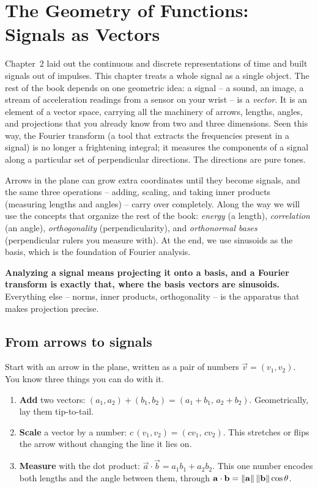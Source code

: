 \chapter{The Geometry of Functions: Signals as Vectors}

\chapterline

Chapter~2 laid out the continuous and discrete representations of time and built signals out of impulses.
This chapter treats a whole signal as a single object. The rest of the book depends on
one geometric idea: a signal -- a sound, an
image, a stream of acceleration readings from a sensor on your wrist -- is a \emph{vector}. It is an element of a vector space, carrying all
the machinery of arrows, lengths, angles, and projections that you already know from two and three
dimensions. Seen this way, the Fourier transform (a tool that extracts the frequencies present in a signal) is no longer a frightening integral; it
measures the components of a signal along a particular
set of perpendicular directions. The directions are pure tones.

Arrows in the plane can grow extra coordinates until they become signals, and the same three
operations -- adding, scaling, and taking inner products (measuring lengths and angles) -- carry over completely. Along the way we
will use the concepts that organize the rest of the book: \emph{energy} (a length),
\emph{correlation} (an angle), \emph{orthogonality} (perpendicularity), and \emph{orthonormal bases}
(perpendicular rulers you measure with). At the end, we use sinusoids as the basis, which is the foundation of Fourier analysis.

\begin{focusbox}
\textbf{Analyzing a signal means projecting it
onto a basis, and a Fourier transform is exactly that, where the basis vectors are sinusoids.}
Everything else -- norms, inner products, orthogonality -- is the apparatus that makes projection precise.
\end{focusbox}

\section{From arrows to signals}
\label{ch03:arrows}

Start with an arrow in the plane, written as a pair of numbers
$\vec{v} = (v_1, v_2)$. You know three things you can do with it.

\begin{enumerate}
  \item \textbf{Add} two vectors: $(a_1,a_2) + (b_1,b_2) = (a_1+b_1,\, a_2+b_2)$. Geometrically,
    lay them tip-to-tail.
  \item \textbf{Scale} a vector by a number: $c\,(v_1,v_2) = (c v_1,\, c v_2)$. This stretches or
    flips the arrow without changing the line it lies on.
  \item \textbf{Measure} with the dot product: $\vec{a}\cdot\vec{b} = a_1 b_1 + a_2 b_2$. This one
    number encodes both lengths and the angle between them, through
    $\mathbf{a}\cdot\mathbf{b} = \lVert\mathbf{a}\rVert\,\lVert\mathbf{b}\rVert\cos\theta$.
\end{enumerate}

